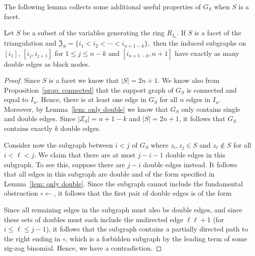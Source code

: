 The following lemma collects some additional useful properties of $G_S$ when $S$ is a facet.  
\begin{lemm}
\label{lem: facet means connected}
Let $S$ be a subset of the variables generating the ring $R_{I_n}$.  If $S$ is a facet of the triangulation and 
$
\mathfrak{Z}_S = \{i_1< i_2 <\cdots < i_{n+1-k}\},
$
then the induced subgraphs on $[i_1]$, $[i_j,i_{j+1}]$ for $1\leq j\leq n-k$ and $[i_{n+1-k},n+1]$ have exactly as many double edges as black nodes.
\end{lemm}
\begin{proof}
Since $S$ is a facet we know that $|S| = 2n+1$.  
We know also from Proposition~\ref{prop: connected} that the support graph of $G_S$ is connected and equal to $I_{n}$. 
Hence, there is at least one edge in $G_S$ for all $n$ edges in $I_{n}$. 
Moreover, by Lemma~\ref{lem: only double} we know that $G_S$ only contains single and double edges. 
Since $|Z_S| = n+1-k$ and $|S| = 2n+1$, it follows that $G_S$ contains exactly $k$ double edges. 

Consider now the subgraph between $i < j$ of $G_S$ where $z_i, z_j \in S$ and $z_\ell\notin S$ for all $i < \ell < j$.  
We claim that there are at most $j - i - 1$ double edges in this subgraph.  
To see this, suppose there are $j-i$ double edges instead.  
It follows that all edges in this subgraph are double and of the form specified in Lemma~\ref{lem: only double}. 
Since the subgraph cannot include the fundamental obstruction $\circ\leftarrow$, it follows that the first pair of double edges is of the form
\begin{center}
\end{center}
Since all remaining edges in the subgraph must also be double edges, and since these sets of doubles must each include the undirected edge $\ell\ell+1$ (for $i\leq \ell\leq j-1$), it follows that the subgraph contains a partially directed path to the right ending in $\circ$, which is a forbidden subgraph by the leading term of some zig-zag binomial. 
Hence, we have a contradiction.  


\end{proof}
